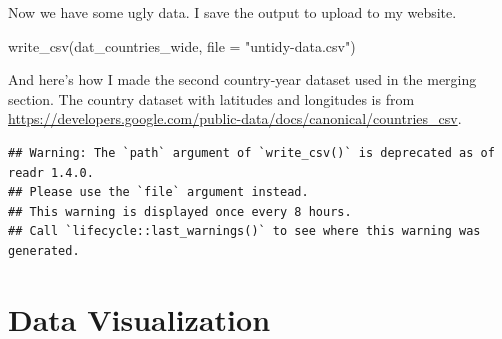 \documentclass[
  12pt,
  oneside,openany]{book}
\newenvironment{Shaded}{\begin{snugshade}}{\end{snugshade}}
\newcommand{\AttributeTok}[1]{\textcolor[rgb]{0.77,0.63,0.00}{#1}}
\newcommand{\DecValTok}[1]{\textcolor[rgb]{0.00,0.00,0.81}{#1}}
\newcommand{\FunctionTok}[1]{\textcolor[rgb]{0.00,0.00,0.00}{#1}}
\newcommand{\NormalTok}[1]{#1}
\newcommand{\OtherTok}[1]{\textcolor[rgb]{0.56,0.35,0.01}{#1}}
\newcommand{\SpecialCharTok}[1]{\textcolor[rgb]{0.00,0.00,0.00}{#1}}
\newcommand{\StringTok}[1]{\textcolor[rgb]{0.31,0.60,0.02}{#1}}
\begin{document}
Now we have some ugly data. I save the output to upload to my website.

\begin{Shaded}
\begin{Highlighting}[]
\FunctionTok{write\_csv}\NormalTok{(dat\_countries\_wide, }\AttributeTok{file =} \StringTok{"untidy{-}data.csv"}\NormalTok{)}
\end{Highlighting}
\end{Shaded}

And here's how I made the second country-year dataset used in the merging section. The country dataset with latitudes and longitudes is from \url{https://developers.google.com/public-data/docs/canonical/countries_csv}.

\begin{Shaded}
\end{Shaded}

\begin{verbatim}
## Warning: The `path` argument of `write_csv()` is deprecated as of readr 1.4.0.
## Please use the `file` argument instead.
## This warning is displayed once every 8 hours.
## Call `lifecycle::last_warnings()` to see where this warning was generated.
\end{verbatim}

\hypertarget{visualization}{%
\chapter{Data Visualization}\label{visualization}}
\end{document}
